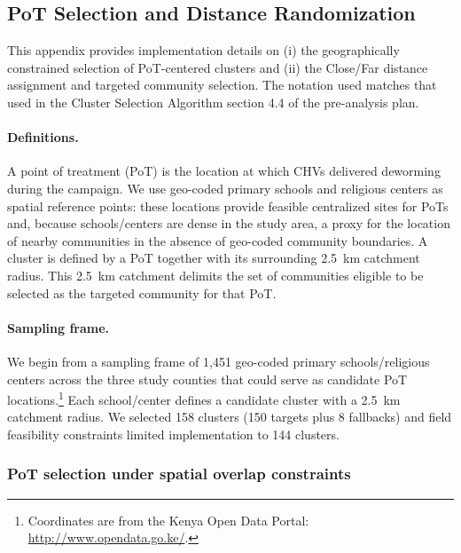 \documentclass[12pt,a4paper]{article}
\begin{document}
\clearpage 

\newpage


\FloatBarrier



\setcounter{table}{0}
\renewcommand{\thetable}{C\arabic{table}}

\setcounter{figure}{0}
\renewcommand{\thefigure}{C\arabic{figure}}

\subsection{PoT Selection and Distance Randomization}\label{sec:site-selection}

This appendix provides implementation details on (i) the geographically constrained selection of PoT-centered clusters
and (ii) the Close/Far distance assignment and targeted community selection. The notation used matches that used in the Cluster Selection Algorithm section 4.4 of the pre-analysis plan.

\paragraph{Definitions.}
A point of treatment (PoT) is the location at which CHVs delivered deworming during the campaign.
We use geo-coded primary schools and religious centers as spatial reference points: these locations provide feasible centralized sites for PoTs
and, because schools/centers are dense in the study area, a proxy for the location of nearby communities in the absence of geo-coded community boundaries. A cluster is defined by a PoT together with its surrounding 2.5~km catchment radius. This 2.5~km catchment delimits the set of communities eligible to be selected as the targeted community for that PoT.

\paragraph{Sampling frame.}
We begin from a sampling frame of 1{,}451 geo-coded primary schools/religious centers across the three study counties that could serve
as candidate PoT locations.\footnote{Coordinates are from the Kenya Open Data Portal: \url{http://www.opendata.go.ke/}.}
Each school/center defines a candidate cluster with a 2.5~km catchment radius. We selected 158 clusters (150 targets plus
8 fallbacks) and field feasibility constraints limited implementation to 144 clusters.%

\subsubsection*{PoT selection under spatial overlap constraints}
\end{document}
